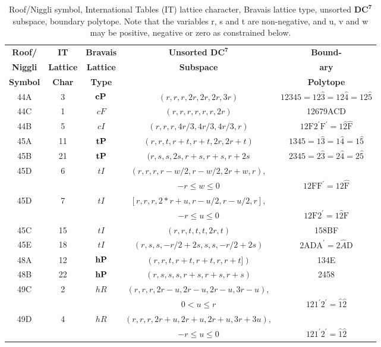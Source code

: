 \documentclass[preprint]{iucr}              %
\begin{document}
{\begin{table}
\caption{Roof/Niggli symbol, International Tables (IT) lattice character, Bravais lattice type, unsorted ${\mathbf{DC}^{\mathbf{7}}}$ subspace, boundary polytope.
Note that the variables r, s and t are non-negative, and u, v and w may be
positive, negative or zero as constrained below.}
\begin{center}
\begin{tabular}{|c|c|c|c|c|}
\hline
{\bf Roof/}     &{\bf IT}&{\bf Bravais}&{\bf Unsorted ${\mathbf{DC}^{\mathbf{7}}}$}&{\bf Bound-}\\
{\bf Niggli}&{\bf Lattice}&{\bf Lattice}&{\bf Subspace}&{\bf ary}\\
{\bf Symbol}&{\bf Char}&{\bf Type}&                             & {\bf Polytope} \\
\hline
44A&3&${\bf cP}$&$(r,r,r,2r,2r,2r,3r)$&$12345\!=\!12\hat{3}\!=\!12\hat{4}\!=\!12\hat{5}$\\
\hline
44C&1&$cF$&$(r,r,r,r,r,r,2r)$&12679ACD\\
\hline
44B&5&$cI$&$(r,r,r,4 r/3,4 r/3, 4 r/3,r)$&$\text{12F2}^{\prime} \text{F}^{\prime} = 1\hat{2}\hat{\text{F}}$\\
\hline
45A&11&${\bf tP}$&$(r,r,t,r+t,r+t,2r,2r+t)$&$1345 = 1\hat{3} = 1\hat{4} = 1\hat{5}$\\
45B&21&${\bf tP}$&$(r,s,s,2s,r+s,r+s,r+2s$&$2345 = 2\hat{3} = 2\hat{4} = 2\hat{5}$\\
\hline
45D&6&$tI$&$(r,r,r,r-w/2,r-w/2,2r+w,r),$&\\
&&&$-r \leq w \leq 0$&$\text{12FF}^{\prime} = 12\hat{\text{F}}$\\
45D&7&$tI$&$[r,r,r,2*r+u,r-u/2,r-u/2,r],$&\\
&&&$-r \leq u \leq 0$&$\text{12F2}^{\prime} = 1{\hat{2}}\text{F}$\\
45C&15&$tI$&$(r,r,t,t,t,2r,t)$&158BF\\
45E&18&$tI$&$(r,s,s,-r/2+2s,s,s,-r/2+2s)$&$\text{2ADA}^{\prime}  = 2{\hat{A}}\text{D}$\\
\hline
48A&12&${\bf hP}$&$(r,r,t,r+t,r+t,r,r+t])$&134E\\
48B&22&${\bf hP}$&$(r,s,s,s,r+s,r+s,r+s)$&2458\\
\hline
49C&2&$hR$&$(r,r,r,2r-u,2r-u,2r-u,3r-u),$&\\
&&&$0 < u \leq r$&$121^\prime 2^\prime = \hat{1}\hat{2}$\\
49D&4&$hR$&$(r,r,r,2r+u,2r+u,2r+u,3r+3u),$&\\
&&&$-r \leq u \leq 0$&$121^\prime 2^\prime = \hat{1}\hat{2}$\\

\end{tabular}
\end{center}
\end{table}}
\end{document}
